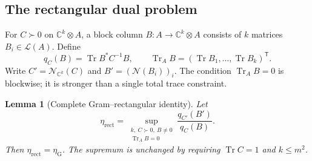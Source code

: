 \documentclass[11pt]{article}
\numberwithin{equation}{section}
\newtheorem{lemma}[theorem]{Lemma}
\theoremstyle{definition}
\theoremstyle{remark}
\DeclareMathOperator{\Tr}{Tr}
\newcommand{\N}{\mathcal N}
\begin{document}
\subsection{The rectangular dual problem}

For $C\succ0$ on $\mathbb C^k\otimes A$, a block column
$B:A\to\mathbb C^k\otimes A$ consists of $k$ matrices $B_i\in\mathcal L(A)$.
Define
\[
 q_C(B)=\Tr B^*C^{-1}B,\qquad
 \Tr_A B=(\Tr B_1,\ldots,\Tr B_k)^{\mathsf T}.
\]
Write $C'=\N_{\mathbb C^k}(C)$ and $B'=(\N(B_i))_i$.
The condition $\Tr_A B=0$ is blockwise; it is stronger than a single total
trace constraint.

\begin{lemma}[Complete Gram--rectangular identity]
\label{lem:rectangular}
Let
\begin{equation}
 \eta_{\mathrm{rect}}=
 \sup_{\substack{k,\ C\succ0,\ B\ne0\\ \Tr_A B=0}}
       \frac{q_{C'}(B')}{q_C(B)} .
 \label{eq:rectangular}
\end{equation}
Then $\eta_{\mathrm{rect}}=\eta_{\mathrm G}$.
The supremum is unchanged by requiring $\Tr C=1$ and $k\leq m^2$.
\end{lemma}
\end{document}

